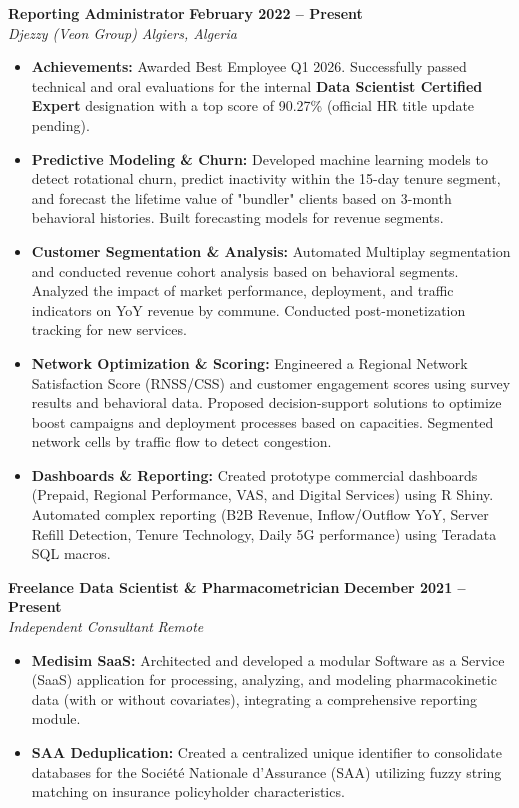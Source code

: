 \documentclass[11pt,letterpaper]{article}
\begin{document}
\noindent
\textbf{Reporting Administrator} \hfill \textbf{February 2022 -- Present} \\
\textit{Djezzy (Veon Group)} \hfill \textit{Algiers, Algeria}
\begin{itemize}[leftmargin=0.2in, itemsep=-2pt, topsep=2pt]
    \item \textbf{Achievements:} Awarded Best Employee Q1 2026. Successfully passed technical and oral evaluations for the internal \textbf{Data Scientist Certified Expert} designation with a top score of 90.27\% (official HR title update pending).
    \item \textbf{Predictive Modeling \& Churn:} Developed machine learning models to detect rotational churn, predict inactivity within the 15-day tenure segment, and forecast the lifetime value of "bundler" clients based on 3-month behavioral histories. Built forecasting models for revenue segments.
    \item \textbf{Customer Segmentation \& Analysis:} Automated Multiplay segmentation and conducted revenue cohort analysis based on behavioral segments. Analyzed the impact of market performance, deployment, and traffic indicators on YoY revenue by commune. Conducted post-monetization tracking for new services.
    \item \textbf{Network Optimization \& Scoring:} Engineered a Regional Network Satisfaction Score (RNSS/CSS) and customer engagement scores using survey results and behavioral data. Proposed decision-support solutions to optimize boost campaigns and deployment processes based on capacities. Segmented network cells by traffic flow to detect congestion.
    \item \textbf{Dashboards \& Reporting:} Created prototype commercial dashboards (Prepaid, Regional Performance, VAS, and Digital Services) using R Shiny. Automated complex reporting (B2B Revenue, Inflow/Outflow YoY, Server Refill Detection, Tenure Technology, Daily 5G performance) using Teradata SQL macros.
\end{itemize}

\noindent
\textbf{Freelance Data Scientist \& Pharmacometrician} \hfill \textbf{December 2021 -- Present} \\
\textit{Independent Consultant} \hfill \textit{Remote}
\begin{itemize}[leftmargin=0.2in, itemsep=-2pt, topsep=2pt]
    \item \textbf{Medisim SaaS:} Architected and developed a modular Software as a Service (SaaS) application for processing, analyzing, and modeling pharmacokinetic data (with or without covariates), integrating a comprehensive reporting module.
    \item \textbf{SAA Deduplication:} Created a centralized unique identifier to consolidate databases for the Société Nationale d'Assurance (SAA) utilizing fuzzy string matching on insurance policyholder characteristics.
\end{itemize}
\end{document}
